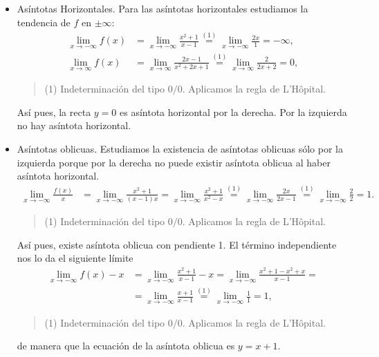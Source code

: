 {\begin{enumerate}
\begin{itemize}
\item Asíntotas Horizontales. Para las asíntotas horizontales estudiamos la tendencia de $f$ en $\pm\infty$:
\begin{align*}
\lim_{x\rightarrow -\infty}f(x)&=\lim_{x\rightarrow -\infty}\frac{x^2+1}{x-1}\stackrel{(1)}{=}\lim_{x\rightarrow -\infty}\frac{2x}{1}=-\infty,\\
\lim_{x\rightarrow \infty}f(x)&=\lim_{x\rightarrow \infty}\frac{2x-1}{x^2+2x+1}\stackrel{(1)}{=}\lim_{x\rightarrow \infty}\frac{2}{2x+2}=0,
\end{align*}
\begin{quote}
\footnotesize
(1) Indeterminación del tipo $0/0$. Aplicamos la regla de L'Hôpital.
\end{quote}
Así pues, la recta $y=0$ es asíntota horizontal por la derecha. Por la izquierda no hay asíntota horizontal.

\item Asíntotas oblicuas. Estudiamos la existencia de asíntotas oblicuas sólo por la izquierda porque por la derecha no puede existir asíntota oblicua al haber asíntota horizontal.
\begin{align*}
\lim_{x\rightarrow -\infty}\frac{f(x)}{x}&=\lim_{x\rightarrow -\infty}\frac{x^2+1}{(x-1)x}=\lim_{x\rightarrow -\infty}\frac{x^2+1}{x^2-x}\stackrel{(1)}{=}\lim_{x\rightarrow -\infty}\frac{2x}{2x-1}\stackrel{(1)}{=}\lim_{x\rightarrow -\infty}\frac{2}{2}=1.
\end{align*}
\begin{quote}
\footnotesize
(1) Indeterminación del tipo $0/0$. Aplicamos la regla de L'Hôpital.
\end{quote}
Así pues, existe asíntota oblicua con pendiente 1. El término independiente nos lo da el siguiente límite
\begin{align*}
\lim_{x\rightarrow -\infty}f(x)-x&=\lim_{x\rightarrow -\infty}\frac{x^2+1}{x-1}-x=\lim_{x\rightarrow -\infty}\frac{x^2+1-x^2+x}{x-1}=\\
&=\lim_{x\rightarrow -\infty}\frac{x+1}{x-1}\stackrel{(1)}{=}\lim_{x\rightarrow -\infty}\frac{1}{1}=1,
\end{align*}
\begin{quote}
\footnotesize
(1) Indeterminación del tipo $0/0$. Aplicamos la regla de L'Hôpital.
\end{quote}
de manera que la ecuación de la asíntota oblicua es $y=x+1$.
\end{itemize}
\end{enumerate}
}


